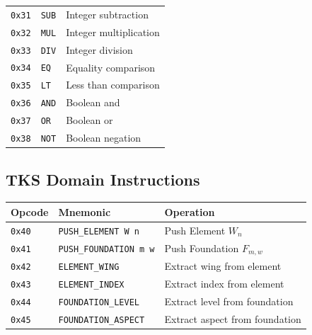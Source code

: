 \begin{definition}
\begin{center}
\begin{tabular}{llp{7cm}}
\texttt{0x31} & \texttt{SUB} & Integer subtraction \\
\texttt{0x32} & \texttt{MUL} & Integer multiplication \\
\texttt{0x33} & \texttt{DIV} & Integer division \\
\texttt{0x34} & \texttt{EQ} & Equality comparison \\
\texttt{0x35} & \texttt{LT} & Less than comparison \\
\texttt{0x36} & \texttt{AND} & Boolean and \\
\texttt{0x37} & \texttt{OR} & Boolean or \\
\texttt{0x38} & \texttt{NOT} & Boolean negation \\
\bottomrule
\end{tabular}
\end{center}
\end{definition}

\subsection{TKS Domain Instructions}
\label{subsec:tks-instructions}

\begin{definition}
\label{def:element-instructions}
\begin{center}
\begin{tabular}{llp{7cm}}
\toprule
\textbf{Opcode} & \textbf{Mnemonic} & \textbf{Operation} \\
\midrule
\texttt{0x40} & \texttt{PUSH\_ELEMENT W n} & Push Element $W_n$ \\
\texttt{0x41} & \texttt{PUSH\_FOUNDATION m w} & Push Foundation $F_{m,w}$ \\
\texttt{0x42} & \texttt{ELEMENT\_WING} & Extract wing from element \\
\texttt{0x43} & \texttt{ELEMENT\_INDEX} & Extract index from element \\
\texttt{0x44} & \texttt{FOUNDATION\_LEVEL} & Extract level from foundation \\
\texttt{0x45} & \texttt{FOUNDATION\_ASPECT} & Extract aspect from foundation \\
\bottomrule
\end{tabular}
\end{center}
\end{definition}

